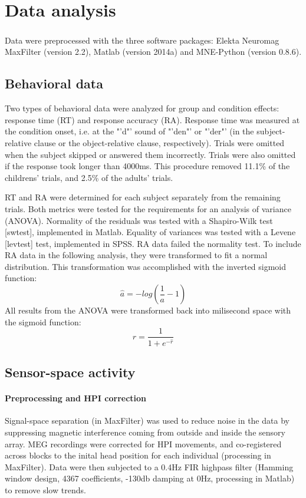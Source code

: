 \section{Data analysis}

Data were preprocessed with the three software packages: Elekta Neuromag\textsuperscript{\textregistered} MaxFilter (version 2.2), Matlab (version 2014a) and MNE-Python (version 0.8.6).

\subsection{Behavioral data}

Two types of behavioral data were analyzed for group and condition effects: response time (RT) and response accuracy (RA).
Response time was measured at the condition onset, i.e. at the "'d"' sound of "'den"' or "'der"' (in the subject-relative clause or the object-relative clause, respectively).
Trials were omitted when the subject skipped or answered them incorrectly.
Trials were also omitted if the response took longer than 4000ms.
This procedure removed 11.1\% of the childrens' trials, and 2.5\% of the adults' trials.

RT and RA were determined for each subject separately from the remaining trials.
Both metrics were tested for the requirements for an analysis of variance (ANOVA).
Normality of the residuals was tested with a Shapiro-Wilk test [swtest], implemented in Matlab.
Equality of variances was tested with a Levene [levtest] test, implemented in SPSS.
RA data failed the normality test.
To include RA data in the following analysis, they were transformed to fit a normal distribution.
This transformation was accomplished with the inverted sigmoid function:
\[ \hat{a} = - log( \frac{1}{a} - 1 ) \]
All results from the ANOVA were transformed back into milisecond space with the sigmoid function:
\[ r = \frac{1}{1+e^{-\hat{r}}} \]


\subsection{Sensor-space activity}

\paragraph{Preprocessing and HPI correction}
Signal-space separation (in MaxFilter) was used to reduce noise in the data by suppressing magnetic interference coming from outside and inside the sensory array.
MEG recordings were corrected for HPI movements, and co-registered across blocks to the inital head position for each individual (processing in MaxFilter).
Data were then subjected to a 0.4Hz FIR highpass filter (Hamming window design, 4367 coefficients, -130db damping at 0Hz, processing in Matlab) to remove slow trends.


